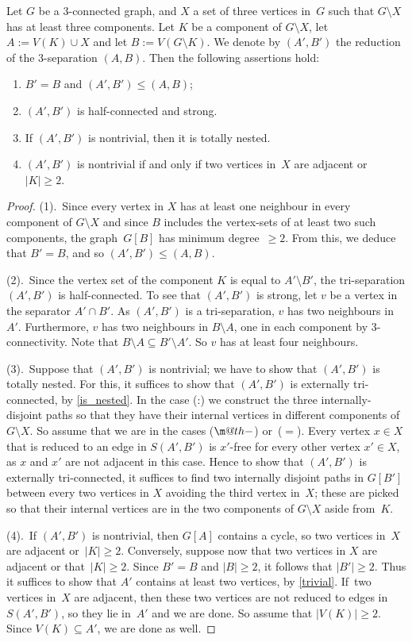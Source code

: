 \documentclass{aic}
\makeatletter
\newcommand{\se}{\subseteq}
\theoremstyle{plain}
\theoremstyle{definition}
\theoremstyle{plain}
\newcommand{\dotminus}{\mathbin{\text{\@dotminus}}}
\newcommand{\@dotminus}{%
  \ooalign{\hidewidth\raise1.2ex\hbox{.}\hidewidth\cr$\m@th-$\cr}%
}
\theoremstyle{plain}
\newcommand{\sm}{\setminus}
\renewcommand{\le}{\leqslant}
\renewcommand{\ge}{\geqslant}
\makeatother
\begin{document}
\begin{lem}\label{K3n lemma}
Let $G$ be a 3-connected graph, and $X$ a set of three vertices in~$G$ such that $G\sm X$ has at least three components.
Let $K$ be a component of $G\sm X$, let $A:=V(K)\cup X$ and let $B:=V(G\sm K)$.
We denote by $(A',B')$ the reduction  of the 3-separation $(A,B)$.
Then the following assertions hold:
\begin{enumerate}
    \item $B'=B$ and $(A',B')\le (A,B)$;
    \item $(A',B')$ is half-connected and strong.
    \item If $(A',B')$ is nontrivial, then it is totally nested.
    \item $(A',B')$ is nontrivial if and only if two vertices in~$X$ are adjacent or $|K|\ge 2$.
\end{enumerate}
\end{lem}
\begin{proof}
(1).~Since every vertex in $X$ has at least one neighbour in every component of $G\sm X$ and since $B$ includes the vertex-sets of at least two such components, the graph~$G[B]$ has minimum degree~$\ge 2$.
From this, we deduce that $B'=B$, and so $(A',B')\le (A,B)$.

(2).~Since the vertex set of the component $K$ is equal to $A'\sm B'$, the tri-separation $(A',B')$ is half-connected. 
To see that $(A',B')$ is strong, let $v$ be a vertex in the separator $A'\cap B'$. 
As $(A',B')$ is a tri-separation, $v$ has two neighbours in~$A'$.
Furthermore, $v$ has two neighbours in $B\sm A$, one in each component by 3-connectivity. Note that $B\sm A\se B'\sm A'$. So $v$ has at least four neighbours.

(3).~Suppose that $(A',B')$ is nontrivial; we have to show that $(A',B')$ is totally nested. For this, it suffices to show that $(A',B')$ is externally tri-connected, by \autoref{is_nested}.
    In the case (:) we construct the three internally-disjoint paths so that they have their internal vertices in different components of $G\sm X$.   
    So assume that we are in the cases ($\dotminus$) or~($=$).
Every vertex $x\in X$ that is reduced to an edge in $S(A',B')$ is $x'$-free for every other vertex $x'\in X$, as $x$ and $x'$ are not adjacent in this case. 
Hence to show that $(A',B')$ is externally tri-connected, it suffices to find two internally 
disjoint paths in $G[B']$ between every two vertices in $X$ avoiding the third vertex in~$X$; these are picked so that their internal vertices are in the two components of $G\sm X$ aside from~$K$.

(4).~If $(A',B')$ is nontrivial, then $G[A]$ contains a cycle, so two vertices in~$X$ are adjacent or~$|K|\ge 2$.
Conversely, suppose now that two vertices in $X$ are adjacent or that~$|K|\ge 2$.
Since $B'=B$ and $|B|\ge 2$, it follows that $|B'| \ge 2$. 
Thus it suffices to show that $A'$ contains at least two vertices, by \autoref{trivial}. 
If~two vertices in~$X$ are adjacent, then these two vertices are not reduced to edges in $S(A',B')$, so they lie in~$A'$ and we are done.
So assume that $|V(K)|\ge 2$. Since $V(K)\se A'$, we are done as well. 
\end{proof}
\end{document}
